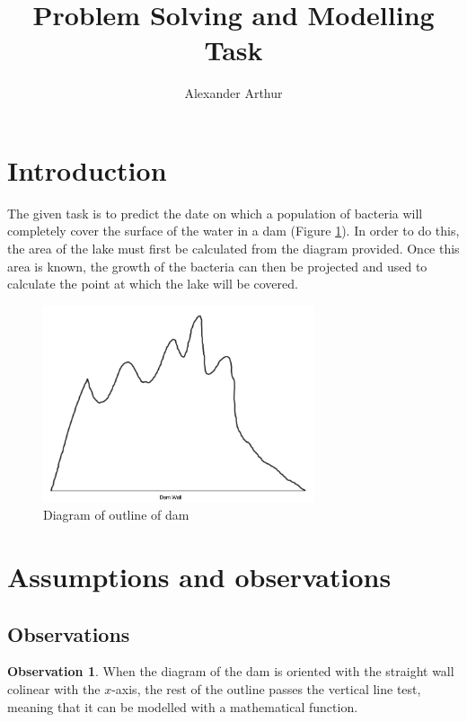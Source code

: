\documentclass{article}
\title{Problem Solving and Modelling Task}
\author{Alexander Arthur}
\theoremstyle{definition}
\newtheorem{observation}{Observation}
\begin{document}
\maketitle
\setcounter{tocdepth}{1}
\tableofcontents


\section{Introduction}
    The given task is to predict the date on which a population of bacteria will completely cover the surface of the water in a dam (Figure \ref{figDamOutline}). In order to do this, the area of the lake must first be calculated from the diagram provided. Once this area is known, the growth of the bacteria can then be projected and used to calculate the point at which the lake will be covered.

    \begin{figure}
        \centering
        \includegraphics[width = 8cm]{damDiagram.png}
        \caption{Diagram of outline of dam}
        \label{figDamOutline}
    \end{figure}



\section{Assumptions and observations}

    \subsection{Observations}

        \begin{observation}
            When the diagram of the dam is oriented with the straight wall colinear with the $x$-axis, the rest of the outline passes the vertical line test, meaning that it can be modelled with a mathematical function.
        \end{observation}
\end{document}
